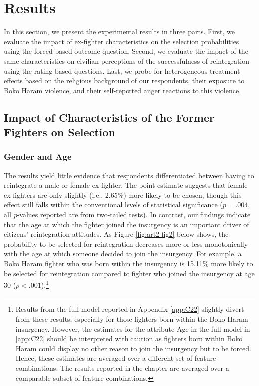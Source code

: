 \section{Results}
In this section, we present the experimental results in three parts. First, we evaluate the impact of ex-fighter characteristics on the selection probabilities using the forced-based outcome question. Second, we evaluate the impact of the same characteristics on civilian perceptions of the successfulness of reintegration using the rating-based questions. Last, we probe for heterogeneous treatment effects based on the religious background of our respondents, their exposure to Boko Haram violence, and their self-reported anger reactions to this violence.


\subsection{Impact of Characteristics of the Former Fighters on Selection}

\subsubsection{Gender and Age}
The results yield little evidence that respondents differentiated between having to reintegrate a male or female ex-fighter. The point estimate suggests that female ex-fighters are only slightly (i.e., 2.65\%) more likely to be chosen, though this effect still falls within the conventional levels of statistical significance ($p = .004$, all \textit{p}-values reported are from two-tailed tests). In contrast, our findings indicate that the age at which the fighter joined the insurgency is an important driver of citizens' reintegration attitudes. As Figure \ref{fig:art2-fig2} below shows, the probability to be selected for reintegration decreases more or less monotonically with the age at which someone decided to join the insurgency. For example, a Boko Haram fighter who was born within the insurgency is 15.11\% more likely to be selected for reintegration compared to fighter who joined the insurgency at age 30 ($p < .001$).\footnote{Results from the full model reported in Appendix \ref{app:C22} slightly divert from these results, especially for those fighters born within the Boko Haram insurgency. However, the estimates for the attribute Age in the full model in \ref{app:C22} should be interpreted with caution as fighters born within Boko Haram could display no other reason to join the insurgency but to be forced. Hence, these estimates are averaged over a different set of feature combinations. The results reported in the chapter are averaged over a comparable subset of feature combinations.}


